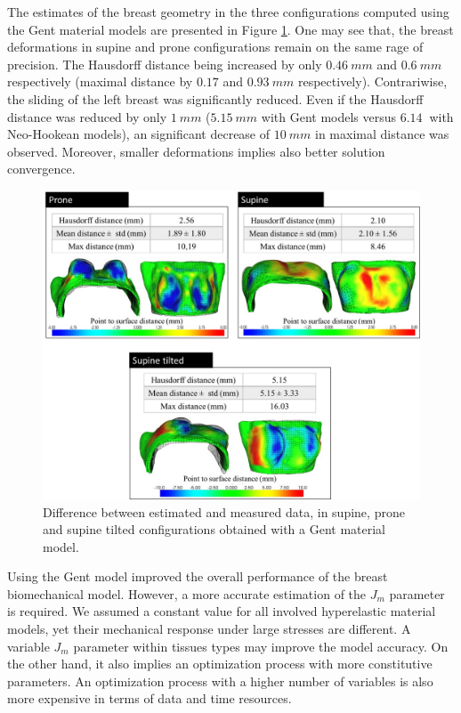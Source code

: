  The estimates of the breast geometry in the three configurations computed using the Gent material models are presented in Figure \ref{fig:modelevaluation_gent}. One may see that, the breast deformations in supine and prone configurations remain on the same rage of precision. The Hausdorff distance being increased by only $0.46 \ mm$ and $0.6\ mm$ respectively (maximal distance by $0.17$ and $0.93 \ mm$ respectively). Contrariwise, the sliding of the left breast was significantly reduced. Even if the Hausdorff distance was reduced by only $1 \ mm $ ($5.15 \ mm$ with Gent models versus $6.14 \ $ with Neo-Hookean models), an significant decrease of $10 \ mm$ in maximal distance  was observed. Moreover, smaller deformations implies also better solution convergence. 
   

\begin{figure}[!h]
\centering
\includegraphics[width=\textwidth,keepaspectratio]{figures/modelevaluation_gent.jpg} 
\caption{Difference between estimated and measured data, in supine, prone and supine tilted configurations obtained with a Gent material model. }\label{fig:modelevaluation_gent}
\end{figure}

Using the Gent model improved the overall performance of the breast biomechanical model. However, a more accurate estimation of the $J_m$ parameter is required. We assumed a constant value for all involved hyperelastic material models, yet their mechanical response under large stresses are different. A variable $J_m$ parameter within tissues types may improve the model accuracy.  On the other hand, it also implies an optimization process with more constitutive parameters. An optimization process with a higher number of variables is also more expensive in terms of data and time resources. 

